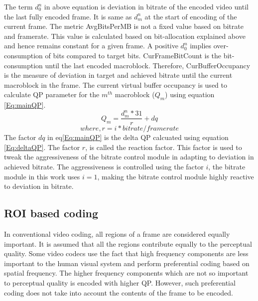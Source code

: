 \documentclass[11pt]{article} %
\begin{document}
The term $d_0^n$ in above equation is deviation in bitrate of the encoded video until the last fully encoded frame. It is same as $d_m^n$ at the start of encoding of the current frame. The metric AvgBitsPerMB is not a fixed value based on bitrate and framerate. This value is calculated based on bit-allocation explained above and hence remains constant for a given frame. A positive $d_0^n$ implies over-consumption of bits compared to target bits. CurFrameBitCount is the bit-consumption until the last encoded macroblock. Therefore, CurBufferOccupancy is the measure of deviation in target and achieved bitrate until the current macroblock in the frame. The current virtual buffer occupancy is used to calculate QP parameter for the $m^{th}$ macroblock ($Q_m$) using equation \ref{Eq:mainQP}.
\begin{equation}
	\label{Eq:mainQP}
	Q_m = \frac{d_m^n * 31}{r} + dq
\end{equation}
\begin{equation}
 where, r = i * bitrate/framerate \nonumber
\end{equation}
The factor $dq$ in eq\ref{Eq:mainQP} is the delta QP calcuated using equation \ref{Eq:deltaQP}. The factor $r$, is called the reaction factor. This factor is used to tweak the aggressiveness of the bitrate control module in adapting to deviation in achieved bitrate. The aggressiveness is controlled using the factor $i$, the bitrate module in this work uses $i = 1$, making the bitrate control module highly reactive to deviation in bitrate. 
  \subsection{ROI based coding}
	In conventional video coding, all regions of a frame are considered equally important. It is assumed that all the regions contribute equally to the perceptual quality. Some video codecs use the fact that high frequency components are less important to the human visual system and perform preferential coding based on spatial frequency. The higher frequency components which are not so important to perceptual quality is encoded with higher QP. However, such preferential coding does not take into account the contents of the frame to be encoded. 
\end{document}
